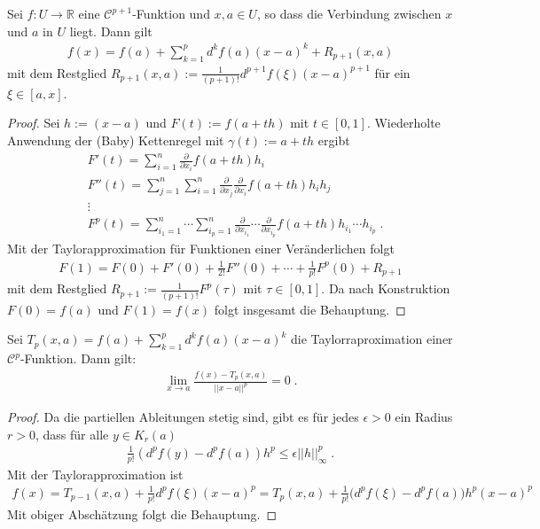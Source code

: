 \begin{Satz}[Taylorapproximation]
Sei   $f: U \to \mathbb{R}$ eine $\mathcal{C}^{p+1}$-Funktion und $x,a \in U$, so dass die Verbindung zwischen $x$ und $a$ in $U$ liegt.
Dann gilt
\begin{align*}
f(x) = f(a) + \sum_{k=1}^{p} d^k f(a) (x-a)^k + R_{p+1} (x,a)
\end{align*}
mit dem Restglied $R_{p+1} (x,a) := \frac{1}{(p+1)!} d^{p+1}f(\xi) (x-a)^{p+1}$ für ein $\xi \in [a,x]$.
\end{Satz}

\begin{proof}
Sei $h := (x-a)$ und $F(t) := f(a + th)$ mit $t \in [0,1]$. Wiederholte Anwendung der (Baby) Kettenregel mit $\gamma(t) := a +th$ ergibt
\begin{align*}
& F'(t) = \sum_{i=1}^n  \frac{\partial}{\partial x_{i}} f(a + th) h_i \\
& F''(t) =\sum_{j=1}^n \sum_{i=1}^n   \frac{\partial}{\partial x_{j}} \frac{\partial}{\partial x_{i}} f(a + th) h_i h_j \\
& \vdots \\
& F^p(t) =  \sum_{i_1=1}^n  \cdots \sum_{i_p=1}^n   \frac{\partial}{\partial x_{i_1}} \cdots \frac{\partial}{\partial x_{i_p}} f(a + th) h_{i_1} \cdots  h_{i_p}  \; .
\end{align*}
Mit der Taylorapproximation für Funktionen einer Veränderlichen folgt
\begin{align*}
 F(1) = F(0) + F'(0) + \frac{1}{2!} F''(0) + \cdots + \frac{1}{p!} F^p(0) + R_{p+1} 
\end{align*}
mit dem Restglied $ R_{p+1}  :=  \frac{1}{(p+1)!}  F^p(\tau)$ mit $\tau \in [0,1]$.
Da nach Konstruktion $F(0) = f(a)$ und $F(1)= f(x)$ folgt insgesamt die Behauptung.
\end{proof}


\begin{Satz}
Sei $T_p(x,a) =  f(a) + \sum_{k=1}^{p} d^k f(a) (x-a)^k$ die Taylorraproximation einer $\mathcal{C}^{p}$-Funktion. Dann gilt: 
\begin{align*}
\lim_{x \to a} \frac{f(x) - T_p(x,a)}{  || x-a  ||^p} = 0 \;. 
\end{align*}
\end{Satz}
\begin{proof}
Da die partiellen Ableitungen stetig sind, gibt es für jedes $\epsilon > 0$ ein Radius $r >0$, dass für alle $y \in K_r(a)$
\begin{align*}
\frac{1}{p!} (d^pf(y) -d^pf(a))h^p \leq \epsilon ||h||_{\infty}^p \; . 
\end{align*}
Mit der Taylorapproximation ist 
\begin{align*}
f(x) = T_{p-1}(x, a) +  \frac{1}{p!} d^{p}f(\xi) (x-a)^{p} = T_p(x,a) +  \frac{1}{p!} \bigl( d^pf(\xi) -d^pf(a) \bigr) h^p (x-a)^p
\end{align*} 
Mit obiger Abschätzung folgt die Behauptung.
\end{proof}


